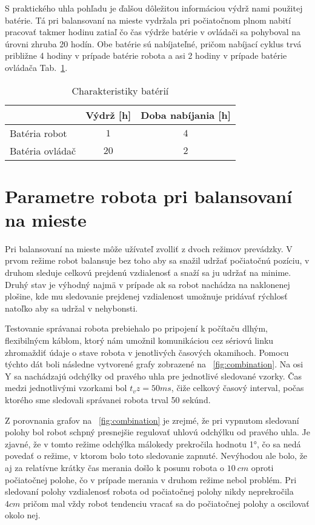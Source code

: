 S praktického uhla pohľadu je ďalšou dôležitou informáciou výdrž nami použitej batérie. Tá pri balansovaní na mieste vydržala pri počiatočnom plnom nabití pracovať takmer hodinu zatiaľ čo čas výdrže batérie v ovládači sa pohyboval na úrovni zhruba 20 hodín. Obe batérie sú nabíjateľné, pričom nabíjací cyklus trvá približne 4 hodiny v prípade batérie robota a asi 2 hodiny v prípade batérie ovládača Tab.~\ref{tab:battery_charge}. 
\bgroup
\def\arraystretch{1.5}
\begin{table}[h]
\centering
\begin{tabular}{|m{3cm}|c|c|}
\hline
 & \textbf{Výdrž [h]} & \textbf{Doba nabíjania [h]}\\
\hline
Batéria robot & $1$ & $4$\\
Batéria ovládač & $20$ & $2$\\
\hline
\end{tabular}
\caption{Charakteristiky batérií}
\label{tab:battery_charge}
\end{table}
\egroup

\section{Parametre robota pri balansovaní na mieste}
Pri balansovaní na mieste môže užívateľ zvolliť z dvoch režimov prevádzky. V prvom režime robot balansuje bez toho aby sa snažil udržať počiatočnú pozíciu, v druhom sleduje celkovú prejdenú vzdialenosť a snaží sa ju udržať na minime. Druhý stav je výhodný najmä v prípade ak sa robot nachádza na naklonenej plošine, kde mu sledovanie prejdenej vzdialenost umožnuje pridávať rýchlosť natoľko aby sa udržal v nehybonsti.

Testovanie správanai robota prebiehalo po pripojení k počítaču dlhým, flexibilnýcm káblom, ktorý nám umožnil komunikáciou cez sériovú linku zhromaždiť údaje o stave robota v jenotlivých časových okamihoch. Pomocu týchto dát boli následne vytvorené grafy zobrazené na  \figurename~\ref{fig:combination}. Na osi Y sa nachádzajú odchýlky od pravého uhla pre jednotlivé sledované vzorky. Čas medzi jednotlivými vzorkami bol $t_vz = 50ms$, čiže celkový časový interval, počas ktorého sme sledovali správanei robota trval 50 sekúnd.

Z porovnania grafov na \figurename~\ref{fig:combination} je zrejmé, že pri vypnutom sledovaní polohy bol robot schpný presnejšie regulovať uhlovú odchýlku od pravého uhla. Je zjavné, že v tomto režime odchýlka málokedy prekročila hodnotu 1°, čo sa nedá povedať o režime, v ktorom bolo toto sledovanie zapnuté. Nevýhodou ale bolo, že aj za relatívne krátky čas merania došlo k posunu robota o $10~cm$ oproti počiatočnej polohe, čo v prípade merania v druhom režime nebol problém. Pri sledovaní polohy vzdialenosť robota od počiatočnej polohy nikdy neprekročila $4cm$ pričom mal vždy robot tendenciu vracať sa do počiatočnej polohy a oscilovať okolo nej.
 

